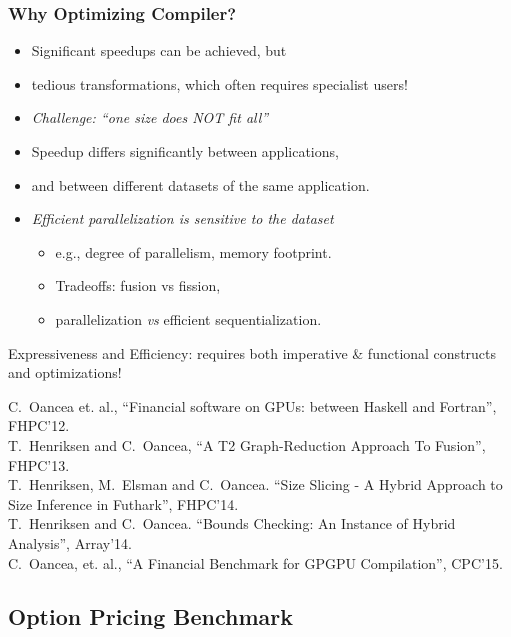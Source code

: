 \documentclass{beamer}
\newcommand{\emp}[1]{\textcolor{DikuRed}{ #1}}
\newcommand{\emphh}[1]{\textcolor{CosGreen}{ #1}}
\begin{document}
\begin{frame}[fragile,t]
  \frametitle{Why Optimizing Compiler?}

\begin{itemize}
    \item Significant speedups can be achieved, but 

    \item tedious transformations, which often requires specialist users!

    \item \emp{\em Challenge: ``one size does NOT fit all''} \smallskip

    \item Speedup differs significantly between applications,

    \item and between different datasets of the same application.\smallskip

    \item \emphh{\em Efficient parallelization is sensitive to the dataset}
        \begin{itemize}
            \item e.g., degree of parallelism, memory footprint.
            \item Tradeoffs: fusion vs fission,
            \item parallelization {\em vs} efficient sequentialization.
        \end{itemize}

\end{itemize}

Expressiveness and Efficiency: requires both imperative \& functional constructs and optimizations! 

\smallskip

\tiny{C.~Oancea et. al., ``Financial software on GPUs: between Haskell and Fortran'', FHPC'12.\\
T.~Henriksen and C.~Oancea, ``A T2 Graph-Reduction Approach To Fusion'', FHPC'13.\\
T.~Henriksen, M.~Elsman and C.~Oancea. ``Size Slicing - A Hybrid Approach to Size Inference in Futhark'', FHPC'14.\\
T.~Henriksen and C.~Oancea. ``Bounds Checking: An Instance of Hybrid Analysis'', Array'14.\\
C.~Oancea, et. al., ``A Financial Benchmark for GPGPU Compilation'', CPC'15.
}


\end{frame}


\subsection{Option Pricing Benchmark}
\end{document}
